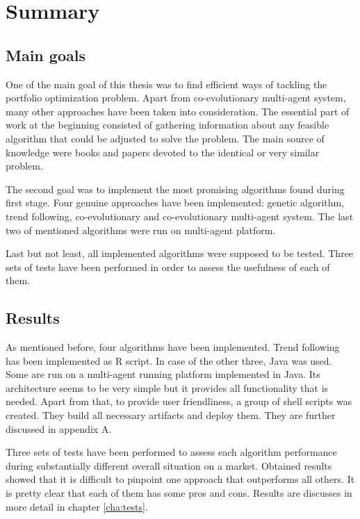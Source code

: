 \chapter{Summary}

\section{Main goals}

One of the main goal of this thesis was to find efficient ways of tackling the portfolio optimization problem.
Apart from co-evolutionary multi-agent system, many other approaches have been taken into consideration.
The essential part of work at the beginning consisted of gathering information about any feasible algorithm that could be adjusted to solve the problem. 
The main source of knowledge were books and papers devoted to the identical or very similar problem. 

The second goal was to implement the most promising algorithms found during first stage.
Four genuine approaches have been implemented: genetic algorithm, trend following, co-evolutionary and co-evolutionary multi-agent system.
The last two of mentioned algorithms were run on multi-agent platform. 

Last but not least, all implemented algorithms were supposed to be tested. 
Three sets of tests have been performed in order to assess the usefulness of each of them.


\section{Results}

As mentioned before, four algorithms have been implemented.
Trend following has been implemented as R script.
In case of the other three, Java was used.
Some are run on a multi-agent running platform implemented in Java.
Its architecture seems to be very simple but it provides all functionality that is needed.
Apart from that, to provide user friendliness, a group of shell scripts was created.
They build all necessary artifacts and deploy them.
They are further discussed in appendix A.
   
Three sets of tests have been performed to assess each algorithm performance during substantially different overall situation on a market.
Obtained results showed that it is difficult to pinpoint one approach that outperforms all others.
It is pretty clear that each of them has some pros and cons.
Results are discusses in more detail in chapter \ref{cha:tests}.


